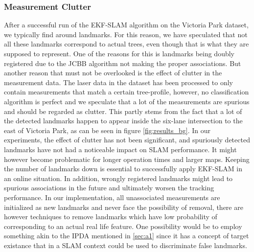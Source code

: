 \subsubsection{Measurement Clutter}
After a successful run of the EKF-SLAM algorithm on the Victoria Park dataset, we typically find around  landmarks. For this reason, we have speculated that not all these landmarks correspond to actual trees, even though that is what they are supposed to represent. One of the reasons for this is landmarks being doubly registered due to the JCBB algorithm not making the proper associations. But another reason that must not be overlooked is the effect of clutter in the measurement data. The laser data in the dataset has been processed to only contain measurements that match a certain tree-profile\cite{victoria}, however, no classification algorithm is perfect and we speculate that a lot of the measurements are spurious and should be regarded as clutter. This partly stems from the fact that a lot of the detected landmarks happen to appear inside the six-lane intersection to the east of Victoria Park, as can be seen in figure \ref{fig:results_bg}. In our experiments, the effect of clutter has not been significant, and spuriously detected landmarks have not had a noticeable impact on SLAM performance. It might however become problematic for longer operation times and larger maps. Keeping the number of landmarks down is essential to successfully apply EKF-SLAM in an online situation. In addition, wrongly registered landmarks might lead to spurious associations in the future and ultimately worsen the tracking performance. In our implementation, all unassociated measurements are initialized as new landmarks and never face the possibility of removal, there are however techniques to remove landmarks which have low probability of corresponding to an actual real life feature. One possibility would be to employ something akin to the IPDA mentioned in \ref{sec:a1} since it has a concept of target existance that in a SLAM context could be used to discriminate false landmarks.

